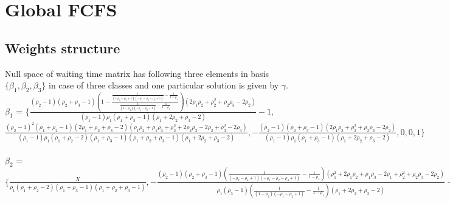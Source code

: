 \documentclass[12pt, a4paper]{report}
\begin{document}




\appendix
\chapter{Global FCFS}
\section{Weights structure}
Null space of waiting time matrix has following three elements in basis $\{\beta_1, \beta_2, \beta_3\}$ in case of three classes and one particular solution is given by $\gamma$.\\ 
$\beta_1$ = 
$\{\frac{(\rho_2-1) (\rho_2+\rho_3-1) \left(1-\frac{\frac{1}{(-\rho_2-\rho_3+1) (-\rho_1-\rho_2-\rho_3+1)}-\frac{1}{1-\rho_1}}{\frac{1}{(1-\rho_2) (-\rho_1-\rho_2+1)}-\frac{1}{1-\rho_1}}\right) \left(2 \rho_1 \rho_2+\rho_2^2+\rho_2 \rho_3-2 \rho_2\right)}{(\rho_1-1) \rho_1 (\rho_1+\rho_3-1) (\rho_1+2 \rho_2+\rho_3-2)}-1,$
\\
$\frac{(\rho_2-1)^2 (\rho_1+\rho_2-1) (2 \rho_1+\rho_2+\rho_3-2) \left(\rho_1 \rho_2+\rho_1 \rho_3+\rho_2^2+2 \rho_2 \rho_3-2 \rho_2+\rho_3^2-2 \rho_3\right)}{(\rho_1-1) \rho_1 (\rho_1+\rho_2-2) (\rho_1+\rho_3-1) (\rho_1+\rho_2+\rho_3-1) (\rho_1+2 \rho_2+\rho_3-2)},-\frac{(\rho_2-1) (\rho_2+\rho_3-1) \left(2 \rho_1 \rho_2+\rho_2^2+\rho_2 \rho_3-2 \rho_2\right)}{(\rho_1-1) \rho_1 (\rho_1+\rho_3-1) (\rho_1+2 \rho_2+\rho_3-2)},0,0,1\}$\\
\\
$\beta_2$ = $\{\frac{X}{\rho_1 (\rho_1+\rho_2-2) (\rho_1+\rho_3-1) (\rho_1+\rho_2+\rho_3-1)}, -\frac{(\rho_2-1) (\rho_2+\rho_3-1) \left(\frac{1}{(-\rho_2-\rho_3+1) (-\rho_1-\rho_2-\rho_3+1)}-\frac{1}{1-\rho_1}\right) \left(\rho_1^2+2 \rho_1 \rho_2+\rho_1 \rho_3-2 \rho_1+\rho_2^2+\rho_2 \rho_3-2 \rho_2\right)}{\rho_1 (\rho_3-1) \left(\frac{1}{(1-\rho_2) (-\rho_1-\rho_2+1)}-\frac{1}{1-\rho_1}\right) (\rho_1+2 \rho_2+\rho_3-2)}-\frac{(\rho_2-1) (\rho_1+\rho_2-1) \left(\rho_1 \rho_3+\rho_3^2-2 \rho_3\right)}{\rho_2 (\rho_3-1) (\rho_1+\rho_2-2) (\rho_1+\rho_3-1)},\frac{(\rho_2-1) (\rho_2+\rho_3-1) \left(\rho_1^2+2 \rho_1 \rho_2+\rho_1 \rho_3-2 \rho_1+\rho_2^2+\rho_2 \rho_3-2 \rho_2\right)}{\rho_1 (\rho_3-1) (\rho_1+2 \rho_2+\rho_3-2)},0,1,0\}$\\
\end{document}
